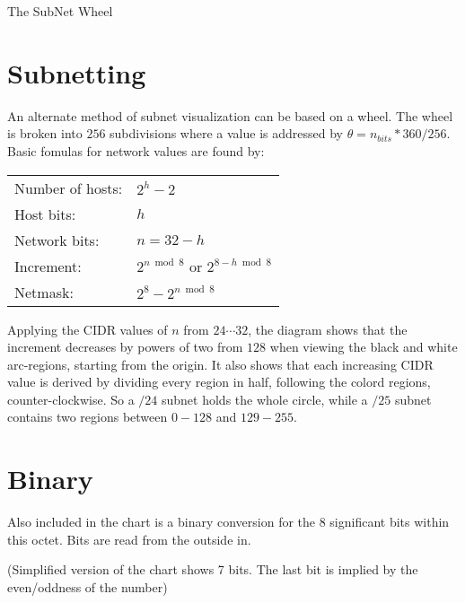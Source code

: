 \documentclass[10pt]{article}
\begin{document}
\thispagestyle{empty}
\begin{center}
  {\Large The SubNet Wheel}\\
\end{center}

\section{Subnetting}

An alternate method of subnet visualization can be based on a wheel. The wheel
is broken into $256$ subdivisions where a value is addressed by
$\theta=n_{bits}*360/256$. Basic fomulas for network values are found by:

\begin{tabular}{ll}
Number of hosts: 	& $2^h-2$\\
Host bits: 		& $h$\\
Network bits: 		& $n=32-h$\\
Increment: 		& $2^{n \bmod 8}$ or $2^{8-h \bmod 8}$\\
Netmask: 		& $2^8-2^{n \bmod 8}$\\
\end{tabular}

Applying the CIDR values of $n$ from $24\cdots32$, the diagram shows that the
increment decreases by powers of two from $128$ when viewing the black and white
arc-regions, starting from the origin. It also shows that each increasing CIDR
value is derived by dividing every region in half, following the colord regions,
counter-clockwise. So a $/24$ subnet holds the whole circle, while a $/25$
subnet contains two regions between $0-128$ and $129-255$.

\section{Binary}

Also included in the chart is a binary conversion for the 8 significant bits
within this octet. Bits are read from the outside in.

(Simplified version of the chart shows 7 bits. The last bit is implied by the
even/oddness of the number)
\end{document}
